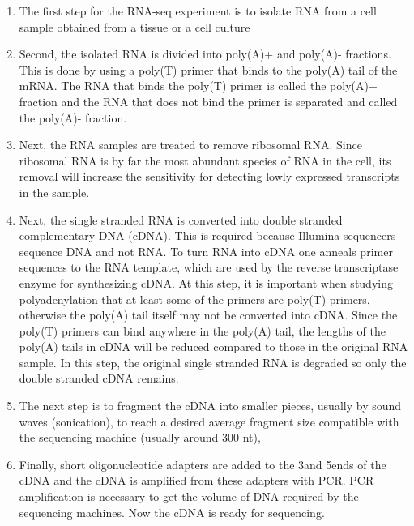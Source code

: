 \begin{enumerate}
	\item The first step for the RNA-seq experiment is to isolate RNA from a
		cell sample obtained from a tissue or a cell culture

	\item Second, the isolated RNA is divided into poly(A)+ and poly(A)-
		fractions. This is done by using a poly(T) primer that binds to the
		poly(A) tail of the mRNA. The RNA that binds the poly(T) primer is
		called the poly(A)+ fraction and the RNA that does not bind the primer
		is separated and called the poly(A)- fraction.

	\item Next, the RNA samples are treated to remove ribosomal RNA. Since
		ribosomal RNA is by far the most abundant species of RNA in the cell,
		its removal will increase the sensitivity for detecting lowly expressed
		transcripts in the sample.

	\item Next, the single stranded RNA is converted into double stranded
        complementary DNA (cDNA). This is required because Illumina sequencers
        sequence DNA and not RNA. To turn RNA into cDNA one anneals primer
        sequences to the RNA template, which are used by the reverse
        transcriptase enzyme for synthesizing cDNA. At this step, it is
        important when studying polyadenylation that at least some of the
        primers are poly(T) primers, otherwise the poly(A) tail itself may not
        be converted into cDNA. Since the poly(T) primers can bind anywhere in
        the poly(A) tail, the lengths of the poly(A) tails in cDNA will be
        reduced compared to those in the original RNA sample. In this step, the
        original single stranded RNA is degraded so only the double stranded
        cDNA remains.

	\item The next step is to fragment the cDNA into smaller pieces, usually by
		sound waves (sonication), to reach a desired average fragment size
		compatible with the sequencing machine (usually around 300 nt),

	\item Finally, short oligonucleotide adapters are added to the 3\ppp and
		5\ppp ends of the cDNA and the cDNA is amplified from these adapters
		with PCR.  PCR amplification is necessary to get the volume of DNA
		required by the sequencing machines. Now the cDNA is ready for
		sequencing.

\end{enumerate}

